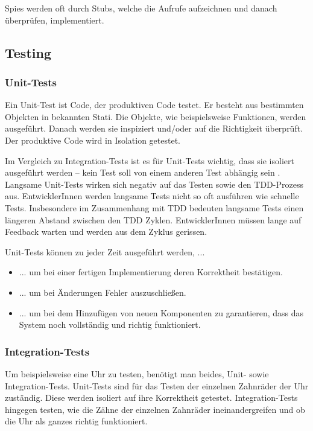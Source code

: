 {Spies werden oft durch Stubs, welche die Aufrufe aufzeichnen und danach überprüfen, implementiert.

\subsection{Testing}

\subsubsection{Unit-Tests}
Ein Unit-Test ist Code, der produktiven Code testet. Er besteht aus bestimmten Objekten in bekannten Stati. Die Objekte, wie beispielsweise Funktionen, werden ausgeführt. Danach werden sie inspiziert und/oder auf die Richtigkeit überprüft. Der produktive Code wird in Isolation getestet.

Im Vergleich zu Integration-Tests ist es für Unit-Tests wichtig, dass sie isoliert ausgeführt werden -- kein Test soll von einem anderen Test abhängig sein \autocite[4]{Johansen:2011}. Langsame Unit-Tests wirken sich negativ auf das Testen sowie den TDD-Prozess aus. EntwicklerInnen werden langsame Tests nicht so oft ausführen wie schnelle Tests. Insbesondere im Zusammenhang mit TDD bedeuten langsame Tests einen längeren Abstand zwischen den TDD Zyklen. EntwicklerInnen müssen lange auf Feedback warten und werden aus dem Zyklus gerissen.

Unit-Tests können zu jeder Zeit ausgeführt werden, ...
\begin{itemize}
  \item ... um bei einer fertigen Implementierung deren Korrektheit bestätigen.
  \item ... um bei Änderungen Fehler auszuschließen.
  \item ... um bei dem Hinzufügen von neuen Komponenten zu garantieren, dass das System noch vollständig und richtig funktioniert.
\end{itemize}


\subsubsection{Integration-Tests}
Um beispielsweise eine Uhr zu testen, benötigt man beides, Unit- sowie Integration-Tests. Unit-Tests sind für das Testen der einzelnen Zahnräder der Uhr zuständig. Diese werden isoliert auf ihre Korrektheit getestet. Integration-Tests hingegen testen, wie die Zähne der einzelnen Zahnräder ineinandergreifen und ob die Uhr als ganzes richtig funktioniert.

}
